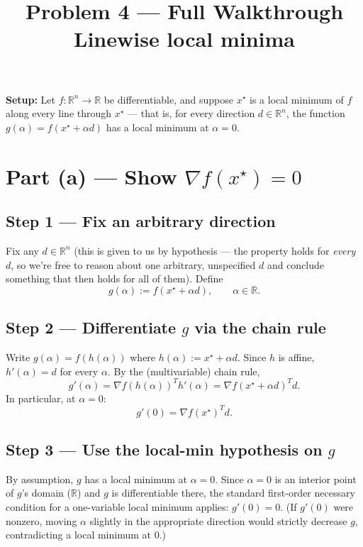 \documentclass[11pt]{article}
\title{Problem 4 --- Full Walkthrough\\ \large Linewise local minima}
\author{}
\date{}
\newcommand{\R}{\mathbb{R}}
\begin{document}
\maketitle

\textbf{Setup:} Let $f:\R^n\to\R$ be differentiable, and suppose $x^\star$ is a local minimum of $f$ along every line through $x^\star$ --- that is, for every direction $d\in\R^n$, the function $g(\alpha) = f(x^\star+\alpha d)$ has a local minimum at $\alpha=0$.

\section*{Part (a) --- Show $\nabla f(x^\star)=0$}

\subsection*{Step 1 --- Fix an arbitrary direction}

Fix any $d\in\R^n$ (this is given to us by hypothesis --- the property holds for \emph{every} $d$, so we're free to reason about one arbitrary, unspecified $d$ and conclude something that then holds for all of them). Define
\[
g(\alpha) := f(x^\star+\alpha d), \qquad \alpha\in\R.
\]

\subsection*{Step 2 --- Differentiate $g$ via the chain rule}

Write $g(\alpha) = f(h(\alpha))$ where $h(\alpha) := x^\star+\alpha d$. Since $h$ is affine, $h'(\alpha) = d$ for every $\alpha$. By the (multivariable) chain rule,
\[
g'(\alpha) = \nabla f(h(\alpha))^T h'(\alpha) = \nabla f(x^\star+\alpha d)^T d.
\]
In particular, at $\alpha=0$:
\[
g'(0) = \nabla f(x^\star)^T d.
\]

\subsection*{Step 3 --- Use the local-min hypothesis on $g$}

By assumption, $g$ has a local minimum at $\alpha=0$. Since $\alpha=0$ is an interior point of $g$'s domain ($\R$) and $g$ is differentiable there, the standard first-order necessary condition for a one-variable local minimum applies: $g'(0)=0$. (If $g'(0)$ were nonzero, moving $\alpha$ slightly in the appropriate direction would strictly decrease $g$, contradicting a local minimum at $0$.)
\end{document}
